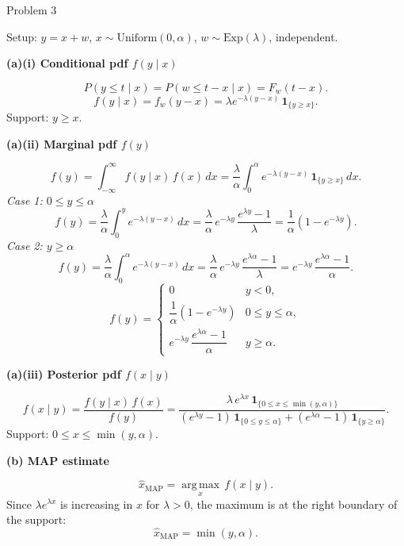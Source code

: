 \documentclass[12pt,a4paper,onecolumn]{exam}
\newcommand{\questionheader}[1]{%
  \begin{tcolorbox}[
    enhanced,
    colback=black,
    coltext=white,
    boxrule=0pt,
    fontupper=\Large\bfseries,
    arc=4mm
  ]
  #1
  \end{tcolorbox}%
}
\begin{document}
\questionheader{Problem 3}

\begin{solution}

Setup: $y = x + w$, $x \sim \mathrm{Uniform}(0,\alpha)$, $w \sim \mathrm{Exp}(\lambda)$, independent.

\textbf{(a)(i) Conditional pdf $f(y \mid x)$}

\[
  P(y \leq t \mid x) = P(w \leq t - x \mid x) = F_w(t-x).
\]
\[
  f(y \mid x) = f_w(y - x) = \lambda e^{-\lambda(y-x)}\,\mathbf{1}_{\{y \geq x\}}.
\]
Support: $y \geq x$.

\textbf{(a)(ii) Marginal pdf $f(y)$}

\[
  f(y) = \int_{-\infty}^{\infty} f(y \mid x)\,f(x)\,dx
        = \frac{\lambda}{\alpha}\int_0^{\alpha} e^{-\lambda(y-x)}\,\mathbf{1}_{\{y \geq x\}}\,dx.
\]
\textit{Case 1: $0 \leq y \leq \alpha$}
\[
  f(y) = \frac{\lambda}{\alpha}\int_0^{y} e^{-\lambda(y-x)}\,dx
        = \frac{\lambda}{\alpha}\,e^{-\lambda y}\,\frac{e^{\lambda y}-1}{\lambda}
        = \frac{1}{\alpha}(1 - e^{-\lambda y}).
\]
\textit{Case 2: $y \geq \alpha$}
\[
  f(y) = \frac{\lambda}{\alpha}\int_0^{\alpha} e^{-\lambda(y-x)}\,dx
        = \frac{\lambda}{\alpha}\,e^{-\lambda y}\,\frac{e^{\lambda\alpha}-1}{\lambda}
        = e^{-\lambda y}\,\frac{e^{\lambda\alpha}-1}{\alpha}.
\]
\[
  f(y) = \begin{cases}
    0 & y < 0,\\
    \dfrac{1}{\alpha}(1 - e^{-\lambda y}) & 0 \leq y \leq \alpha,\\[6pt]
    e^{-\lambda y}\,\dfrac{e^{\lambda\alpha}-1}{\alpha} & y \geq \alpha.
  \end{cases}
\]

\textbf{(a)(iii) Posterior pdf $f(x \mid y)$}

\[
  f(x \mid y) = \frac{f(y \mid x)\,f(x)}{f(y)}
    = \frac{\lambda\,e^{\lambda x}\,\mathbf{1}_{\{0 \leq x \leq \min(y,\alpha)\}}}
           {(e^{\lambda y}-1)\,\mathbf{1}_{\{0 \leq y \leq \alpha\}} + (e^{\lambda\alpha}-1)\,\mathbf{1}_{\{y \geq \alpha\}}}.
\]
Support: $0 \leq x \leq \min(y,\alpha)$.

\textbf{(b) MAP estimate}

\[
  \hat{x}_{\mathrm{MAP}} = \operatorname*{arg\,max}_{x}\, f(x \mid y).
\]
Since $\lambda e^{\lambda x}$ is increasing in $x$ for $\lambda > 0$, the maximum is at the right boundary of the support:
\[
  \boxed{\hat{x}_{\mathrm{MAP}} = \min(y,\alpha).}
\]


\end{solution}
\end{document}
